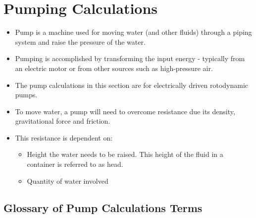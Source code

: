 %
%
%
%
%






\section{Pumping Calculations}
\begin{itemize}
\item Pump is a machine used for moving water (and other fluids) through a piping system and raise the pressure of the water.
\item Pumping is accomplished by transforming the input energy - typically from an electric motor or from other sources such as high-pressure air.
\item The pump calculations in this section are for electrically driven rotodynamic pumps.
\item To move water, a pump will need to overcome resistance due its density, gravitational force and friction.
\item This resistance is dependent on:
\begin{itemize}
\item Height the water needs to be raised.  This height of the fluid in a container is referred to as head. 
\item Quantity of water involved
\end{itemize}
\end{itemize}

\subsection{Glossary of Pump Calculations Terms}

